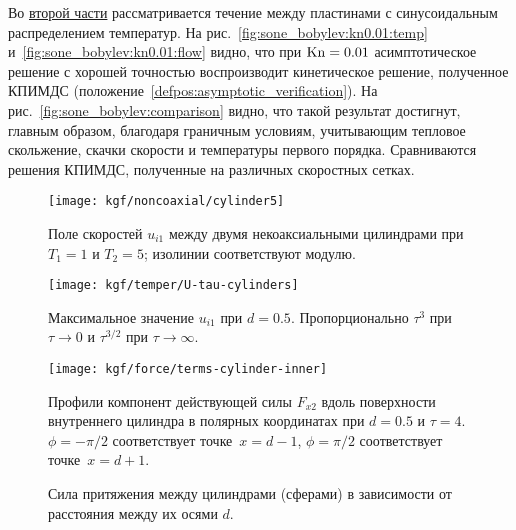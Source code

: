 Во \underline{второй части} рассматривается течение между пластинами с синусоидальным распределением температур.
На рис.~\ref{fig:sone_bobylev:kn0.01:temp} и~\ref{fig:sone_bobylev:kn0.01:flow} видно,
что при \(\mathrm{Kn}=0.01\) асимптотическое решение с хорошей точностью воспроизводит кинетическое решение,
полученное КПИМДС (положение~\ref{defpos:asymptotic_verification}).
На рис.~\ref{fig:sone_bobylev:comparison} видно, что такой результат достигнут, главным образом,
благодаря граничным условиям, учитывающим тепловое скольжение, скачки скорости и температуры первого порядка.
Сравниваются решения КПИМДС, полученные на различных скоростных сетках.


\begin{figure}
    \centering
    \texttt{[image: kgf/noncoaxial/cylinder5]}
    \caption{Поле скоростей \(u_{i1}\) между двумя некоаксиальными цилиндрами при \(T_1=1\) и \(T_2=5\);
        изолинии соответствуют модулю.}
    \label{fig:cylinders:velocity}
\end{figure}

\begin{figure}
    \centering
    \begin{minipage}{.48\textwidth}
        \texttt{[image: kgf/temper/U-tau-cylinders]}
        \caption{Максимальное значение \(u_{i1}\) при \(d=0.5\).
            Пропорционально \(\tau^3\) при \(\tau\to0\) и \(\tau^{3/2}\) при \(\tau\to\infty\).}
        \label{fig:cylinders:maxU}
    \end{minipage}
    \hfill
    \begin{minipage}{.48\textwidth}
        \texttt{[image: kgf/force/terms-cylinder-inner]}
        \caption{Профили компонент действующей силы \(F_{x2}\) вдоль поверхности внутреннего цилиндра
            в полярных координатах при \(d=0.5\) и \(\tau=4\).
            \(\phi = -\pi/2\) соответствует точке~\(x=d-1\), \(\phi = \pi/2\) соответствует точке~\(x=d+1\).}
        \label{fig:cylinders:terms_inner}
    \end{minipage}
\end{figure}

\begin{figure}
    \centering
    \caption{Сила притяжения между цилиндрами (сферами) в зависимости от расстояния между их осями \(d\).}
    \label{fig:cylinders:force}
\end{figure}

